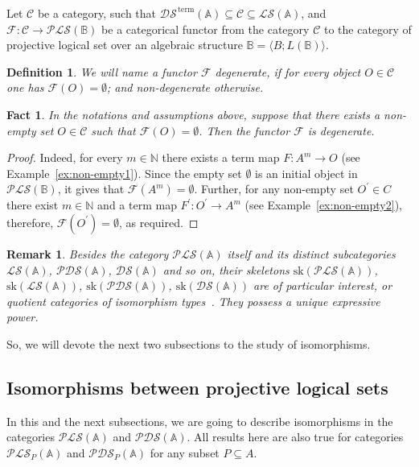 \documentclass[12pt]{article}
\newtheorem{fact}{Fact}
\newtheorem{remark}{Remark}
\newtheorem{definition}{Definition}
\theoremstyle{definition}
\def\N{{\mathbb{N}}}
\def\MA{{\mathbb{A}}}
\def\MB{{\mathbb{B}}}
\def\F{{\mathcal{F}}}
\def\sk{\mathrm{sk}}
\def\PLS{{\mathcal{PLS}}}
\def\PDS{{\mathcal{PDS}}}
\def\DS{{\mathcal{DS}}}
\def\SC{{\mathcal{C}}}
\def\LS{{\mathcal{LS}}}
\def\term{{\,\mathrm{term}}}
\begin{document}
Let $\SC$ be a category, such that $\DS^\term(\MA) \subseteq \SC \subseteq \LS(\MA)$, and $\F\colon \SC\to \PLS(\MB)$ be a categorical functor from the category $\SC$ to the category of projective logical set over an algebraic structure $\MB=\langle B; L(\MB)\rangle$. 

\begin{definition}
 We will name a functor $\F$ {\em degenerate}, if for every object $O\in \SC$ one has $\F(O)=\emptyset$; and {\em non-degenerate} otherwise.   
\end{definition}

\begin{fact}\label{fact:empty}
In the notations and assumptions above, suppose that there exists a non-empty set $O\in \SC$ such that $\F(O)=\emptyset$. Then the functor $\F$ is degenerate.    
\end{fact}

\begin{proof}
Indeed, for every $m\in \N$ there exists a term map $F\colon A^m\to O$ (see Example~\ref{ex:non-empty1}). Since the empty set $\emptyset$ is an initial object in $\PLS(\MB)$, it gives that $\F(A^m)=\emptyset$. Further, for any non-empty set $O^\prime\in C$ there exist $m\in \N$ and a term map $F^\prime\colon O^\prime\to A^m$ (see Example~\ref{ex:non-empty2}), therefore, $\F(O^\prime)=\emptyset$, as required.
\end{proof}

\begin{remark}
Besides the category $\PLS(\MA)$ itself and its distinct subcategories $\LS(\MA)$, $\PDS(\MA)$, $\DS(\MA)$  and so on, their skeletons  $\sk(\PLS(\MA))$, $\sk(\LS(\MA))$, $\sk(\PDS(\MA))$, $\sk(\DS(\MA))$ are of particular interest, or quotient categories of isomorphism types~\cite{Fritsch}. They possess a unique expressive power. 
\end{remark}

So, we will devote the next two subsections to the study of isomorphisms.

\subsection{Isomorphisms between projective logical sets}\label{subsec:iso_PLS}

In this and the next subsections, we are going to describe isomorphisms in the categories $\PLS(\MA)$ and $\PDS(\MA)$. All results here are also true for categories $\PLS_P(\MA)$ and $\PDS_P(\MA)$ for any subset $P\subseteq A$. 
\end{document}

